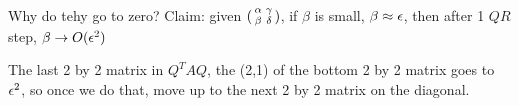 Why do tehy go to zero? Claim: given
$(
\begin{smallmatrix}
  \alpha & \gamma \\ \beta & \delta
\end{smallmatrix})
$, if $\beta$ is small, $\beta\approx \epsilon$, then after 1 $QR$ step,
$\beta \rightarrow O(\epsilon^2)$

The last 2 by 2 matrix in $Q^TAQ$, the (2,1)  of the bottom 2 by 2
matrix goes to $\epsilon^2$, so once we do that, move up to the next 2 by
2 matrix on the diagonal.


